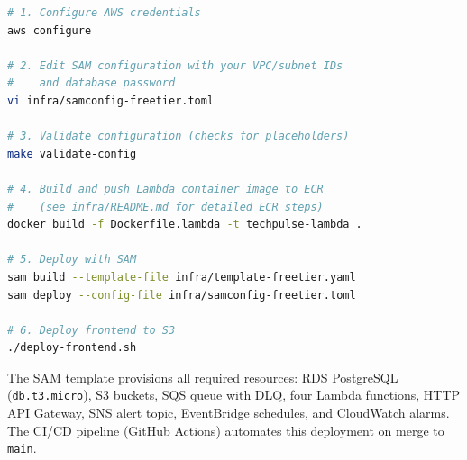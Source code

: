 \begin{lstlisting}[language=bash, basicstyle=\ttfamily\small]
# 1. Configure AWS credentials
aws configure

# 2. Edit SAM configuration with your VPC/subnet IDs
#    and database password
vi infra/samconfig-freetier.toml

# 3. Validate configuration (checks for placeholders)
make validate-config

# 4. Build and push Lambda container image to ECR
#    (see infra/README.md for detailed ECR steps)
docker build -f Dockerfile.lambda -t techpulse-lambda .

# 5. Deploy with SAM
sam build --template-file infra/template-freetier.yaml
sam deploy --config-file infra/samconfig-freetier.toml

# 6. Deploy frontend to S3
./deploy-frontend.sh
\end{lstlisting}

\noindent The SAM template provisions all required resources: RDS PostgreSQL (\texttt{db.t3.micro}), S3 buckets, SQS queue with DLQ, four Lambda functions, HTTP API Gateway, SNS alert topic, EventBridge schedules, and CloudWatch alarms. The CI/CD pipeline (GitHub Actions) automates this deployment on merge to \texttt{main}.

